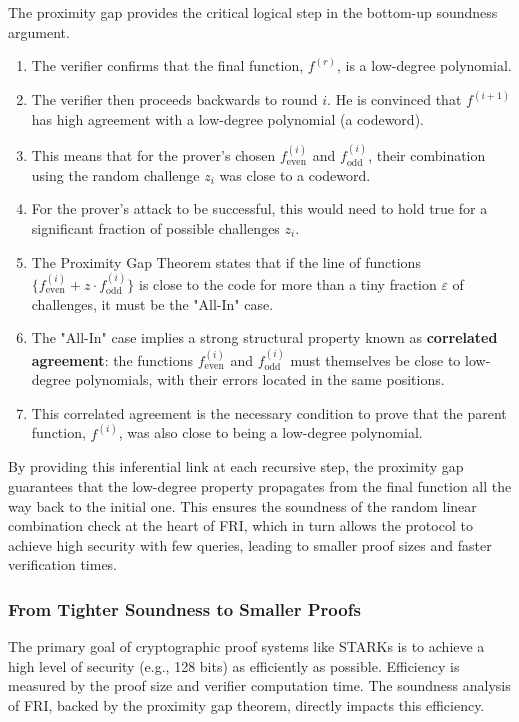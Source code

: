 \documentclass{article}
\begin{document}
\begin{tcolorbox}[breakable, title={How the Proximity Gap Secures FRI}]
The proximity gap provides the critical logical step in the bottom-up soundness argument.
\begin{enumerate}
    \item The verifier confirms that the final function, $f^{(r)}$, is a low-degree polynomial.
    \item The verifier then proceeds backwards to round $i$. He is convinced that $f^{(i+1)}$ has high agreement with a low-degree polynomial (a codeword).
    \item This means that for the prover's chosen $f^{(i)}_{\text{even}}$ and $f^{(i)}_{\text{odd}}$, their combination using the random challenge $z_i$ was close to a codeword.
    \item For the prover's attack to be successful, this would need to hold true for a significant fraction of possible challenges $z_i$.
    \item The Proximity Gap Theorem states that if the line of functions $\{ f^{(i)}_{\text{even}} + z \cdot f^{(i)}_{\text{odd}} \}$ is close to the code for more than a tiny fraction $\varepsilon$ of challenges, it must be the "All-In" case.
    \item The "All-In" case implies a strong structural property known as \textbf{correlated agreement}: the functions $f^{(i)}_{\text{even}}$ and $f^{(i)}_{\text{odd}}$ must themselves be close to low-degree polynomials, with their errors located in the same positions.
    \item This correlated agreement is the necessary condition to prove that the parent function, $f^{(i)}$, was also close to being a low-degree polynomial.
\end{enumerate}
By providing this inferential link at each recursive step, the proximity gap guarantees that the low-degree property propagates from the final function all the way back to the initial one. This ensures the soundness of the random linear combination check at the heart of FRI, which in turn allows the protocol to achieve high security with few queries, leading to smaller proof sizes and faster verification times.
\end{tcolorbox}


\subsubsection{From Tighter Soundness to Smaller Proofs}
The primary goal of cryptographic proof systems like STARKs is to achieve a high level of security (e.g., 128 bits) as efficiently as possible. Efficiency is measured by the proof size and verifier computation time. The soundness analysis of FRI, backed by the proximity gap theorem, directly impacts this efficiency.
\end{document}
